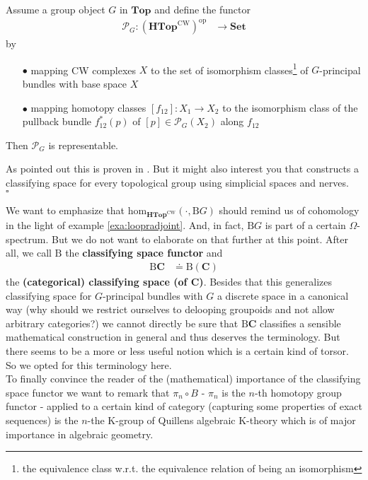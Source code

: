\begin{thm}
\label{thm:repofbundlefunc}
Assume a group object $G$ in $\mathbf{Top}$ and define the functor
\begin{align*}
  \mathcal{P}_{G}
  \colon
  \left(
    \mathbf{HTop}^{\textrm{CW}}
  \right)^{\mathrm{op}}
  &\rightarrow
  \mathbf{Set}
\end{align*}
by
\begin{enumerate}
\item[$\bullet$]
mapping CW complexes $X$ to the set of isomorphism classes\footnote{the equivalence class w.r.t. the equivalence relation of being an isomorphism} of $G$-principal bundles with base space $X$
\item[$\bullet$]
mapping homotopy classes $[f_{12}] \colon X_{1} \rightarrow X_{2}$ to the isomorphism class of the pullback bundle $f_{12}^{\ast}(p)$ of $[p] \in \mathcal{P}_{G}(X_{2})$ along $f_{12}$
\end{enumerate}
Then $\mathcal{P}_{G}$ is representable.
\end{thm}
\begin{prf}
As pointed out this is proven in \cite{4dc38f27}. But it might also interest you that \cite{6d9ad807} constructs a classifying space for every topological group using simplicial spaces and nerves. 
\\
\phantom{proven}
\hfill
$\square$
\end{prf}
We want to emphasize that $\mathrm{hom}_{\mathbf{HTop}^{\textrm{CW}}}(\cdot,\mathrm{B}G)$ should remind us of cohomology in the light of example \ref{exa:loopradjoint}. And, in fact, $\mathrm{B}G$ is part of a certain $\Omega$-spectrum. But we do not want to elaborate on that further at this point. After all, we call $\mathrm{B}$ the \textbf{classifying space functor} and
\begin{align*}
  \mathrm{B}
  \mathbf{C}
  &\doteq
  \mathrm{B}(\mathbf{C})
\end{align*}
the \textbf{(categorical) classifying space (of $\mathbf{C}$)}. Besides that this generalizes classifying space for $G$-principal bundles with $G$ a discrete space in a canonical way (why should we restrict ourselves to delooping groupoids and not allow arbitrary categories?) we cannot directly be sure that $\mathrm{B}\mathbf{C}$ classifies a sensible mathematical construction in general and thus deserves the terminology. But there seems to be a more or less useful notion which is a certain kind of torsor. So we opted for this terminology here.
\\
To finally convince the reader of the (mathematical) importance of the classifying space functor we want to remark that $\pi_{n} \circ B$ - $\pi_{n}$ is the $n$-th homotopy group functor - applied to a certain kind of category (capturing some properties of exact sequences) is the $n$-the K-group of Quillens algebraic K-theory which is of major importance in algebraic geometry.
